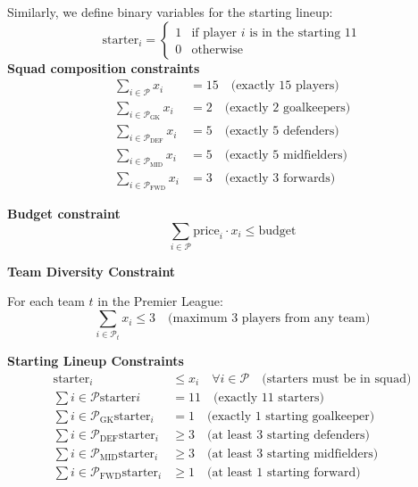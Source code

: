 Similarly, we define binary variables for the starting lineup:
\begin{equation}
    \text{starter}_i =
    \begin{cases}
        1 & \text{if player $i$ is in the starting 11} \\
        0 & \text{otherwise}
    \end{cases}
\end{equation}
\break
\textbf{Squad composition constraints}
\begin{align}
    \sum_{i \in \mathcal{P}} x_i &= 15 \quad \text{(exactly 15 players)} \\
    \sum_{i \in \mathcal{P}_{\text{GK}}} x_i &= 2 \quad \text{(exactly 2 goalkeepers)} \\
    \sum_{i \in \mathcal{P}_{\text{DEF}}} x_i &= 5 \quad \text{(exactly 5 defenders)} \\
    \sum_{i \in \mathcal{P}{_\text{MID}}} x_i &= 5 \quad \text{(exactly 5 midfielders)} \\
    \sum_{i \in \mathcal{P}_{\text{FWD}}} x_i &= 3 \quad \text{(exactly 3 forwards)}
\end{align}

\textbf{Budget constraint}
\begin{equation}
    \sum_{i \in \mathcal{P}} \text{price}_i \cdot x_i \leq \text{budget}
\end{equation}

\textbf{Team Diversity Constraint}

For each team $t$ in the Premier League:
\begin{equation}
\sum_{i \in \mathcal{P}_t} x_i \leq 3 \quad \text{(maximum 3 players from any team)}
\end{equation}

\textbf{Starting Lineup Constraints}
\begin{align}
    \text{starter}_i &\leq x_i \quad \forall i \in \mathcal{P} \quad \text{(starters must be in squad)} \\
    \sum{i \in \mathcal{P}} \text{starter}i &= 11 \quad \text{(exactly 11 starters)} \\
    \sum{i \in \mathcal{P}_{\text{GK}}} \text{starter}_i &= 1 \quad \text{(exactly 1 starting goalkeeper)} \\
    \sum{i \in \mathcal{P}_{\text{DEF}}} \text{starter}_i &\geq 3 \quad \text{(at least 3 starting defenders)} \\
    \sum{i \in \mathcal{P}_{\text{MID}}} \text{starter}_i &\geq 3 \quad \text{(at least 3 starting midfielders)} \\
    \sum{i \in \mathcal{P}_{\text{FWD}}} \text{starter}_i &\geq 1 \quad \text{(at least 1 starting forward)}
\end{align}

